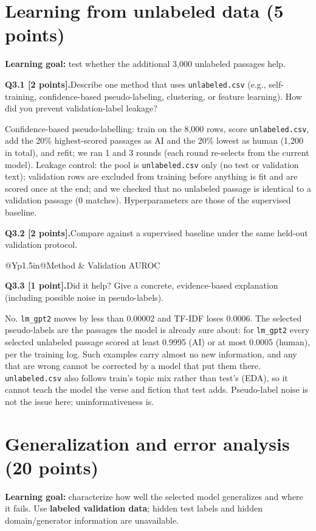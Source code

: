 \documentclass[11pt,letterpaper]{article}
\newcommand{\question}[2]{\needspace{4\baselineskip}\par\addvspace{0.45em}\noindent\textbf{#1}\quad #2\par\nobreak\vspace{0.1em}}
\begin{document}
\section{Learning from unlabeled data (5 points)}
\textbf{Learning goal:} test whether the additional 3,000 unlabeled passages help.
\question{Q3.1 [2 points].}{Describe one method that uses \texttt{unlabeled.csv} (e.g., self-training, confidence-based pseudo-labeling, clustering, or feature learning). How did you prevent validation-label leakage?}
Confidence-based pseudo-labelling: train on the 8,000 rows, score \texttt{unlabeled.csv}, add the 20\% highest-scored passages as AI and the 20\% lowest as human (1,200 in total), and refit; we ran 1 and 3 rounds (each round re-selects from the current model). Leakage control: the pool is \texttt{unlabeled.csv} only (no test or validation text); validation rows are excluded from training before anything is fit and are scored once at the end; and we checked that no unlabeled passage is identical to a validation passage (0 matches). Hyperparameters are those of the supervised baseline.
\question{Q3.2 [2 points].}{Compare against a supervised baseline under the same held-out validation protocol.}
\begin{tabularx}{\linewidth}{@{}Yp{1.5in}@{}}\toprule Method & Validation AUROC \\ \midrule
{}
\bottomrule\end{tabularx}
\question{Q3.3 [1 point].}{Did it help? Give a concrete, evidence-based explanation (including possible noise in pseudo-labels).}
No. \texttt{lm\_gpt2} moves by less than 0.00002 and TF-IDF loses 0.0006. The selected pseudo-labels are the passages the model is already sure about: for \texttt{lm\_gpt2} every selected unlabeled passage scored at least 0.9995 (AI) or at most 0.0005 (human), per the training log. Such examples carry almost no new information, and any that are wrong cannot be corrected by a model that put them there. \texttt{unlabeled.csv} also follows train's topic mix rather than test's (EDA), so it cannot teach the model the verse and fiction that test adds. Pseudo-label noise is not the issue here; uninformativeness is.

\newpage
\section{Generalization and error analysis (20 points)}
\textbf{Learning goal:} characterize how well the selected model generalizes and where it fails. Use \textbf{labeled validation data}; hidden test labels and hidden domain/generator information are unavailable.
\end{document}
